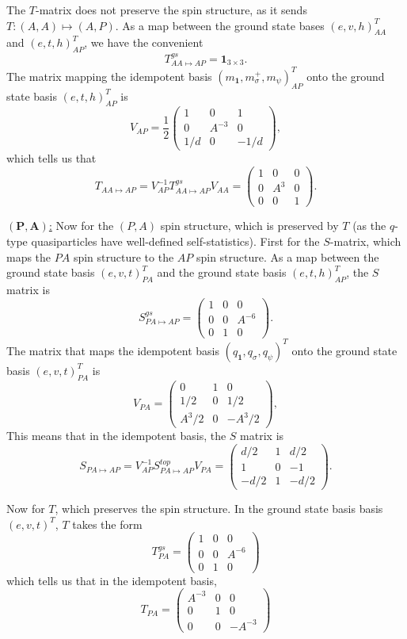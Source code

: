 \documentclass[12pt,a4paper]{article}
\newcommand{\unit}{\mathbf{1}}
\newcommand\be            {\begin{equation}}
\newcommand\ee            {\end{equation}}
\begin{document}
The $T$-matrix does not preserve the spin structure, as it sends $T : (A,A) \mapsto (A,P)$. As a map between the ground state bases $(e,v,h)^T_{AA}$ and $(e,t,h)_{AP}^T$, we have the convenient  
\be T_{AA\mapsto AP}^{gs} = \unit_{3\times 3}.\ee
The matrix mapping the idempotent basis $(m_\unit,m_\sigma^+,m_\psi)^T_{AP}$ onto the ground state basis $(e,t,h)_{AP}^T$  is
\be V_{AP} = \frac{1}{2} \begin{pmatrix} 1 & 0 & 1 \\ 0 & A^{-3} & 0 \\ 1/d & 0 & -1/d \end{pmatrix},\ee
which tells us that 
\be T_{AA\mapsto AP} = V_{AP}^{-1} T_{AA\mapsto AP}^{gs} V_{AA} =  \begin{pmatrix}
1 &0&0 \\ 0&A^3&0\\0&0&1
\end{pmatrix}.\ee


\underline{$\mathbf{(P,A)}$:} Now for the $(P,A)$ spin structure, which is preserved by $T$ (as the $q$-type quasiparticles have well-defined self-statistics). First for the $S$-matrix, which maps the $PA$ spin structure to the $AP$ spin structure. As a map between the ground state basis $(e,v,t)_{PA}^T$ and the ground state basis $(e,t,h)_{AP}^T$, the $S$ matrix is
\be S^{gs}_{PA\mapsto AP} = \begin{pmatrix}
1 & 0& 0 \\ 0 & 0 & A^{-6} \\ 0&1& 0
\end{pmatrix}.\ee
The matrix that maps the idempotent basis $(q_\unit,q_\sigma,q_\psi)^T$ onto the ground state basis $(e,v,t)_{PA}^T$ is 
\be V_{PA} = \begin{pmatrix}
0 & 1 & 0 \\ 1/2 & 0 & 1/2 \\ A^3/2 & 0 & -A^3/2
\end{pmatrix},\ee
This means that in the idempotent basis, the $S$ matrix is 
\be S_{PA \mapsto AP} = V_{AP}^{-1} S^{top}_{PA \mapsto AP} V_{PA} = \begin{pmatrix}
d/2 & 1 & d/2 \\ 1 & 0 & -1 \\ -d/2 & 1 & -d/2
\end{pmatrix}.\ee

Now for $T$, which preserves the spin structure. In the ground state basis basis $(e,v,t)^T$, $T$ takes the form 
\be T^{gs}_{PA} = \begin{pmatrix}
1 & 0 & 0\\ 0 & 0 & A^{-6} \\ 0&1&0 
\end{pmatrix}\ee
which tells us that in the idempotent basis, 
\be T_{PA}  = \begin{pmatrix}
A^{-3} & 0 & 0 \\ 0 & 1 & 0 \\ 0 & 0 & -A^{-3}
\end{pmatrix}\ee
\end{document}
